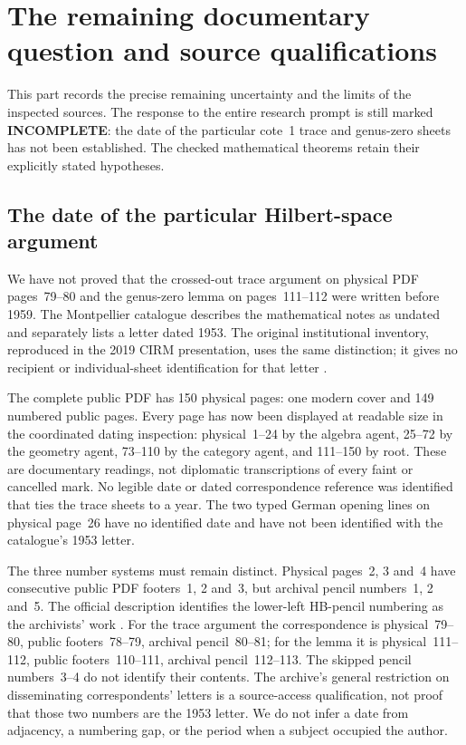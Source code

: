 \section{The remaining documentary question and source qualifications}

This part records the precise remaining uncertainty and the limits of
the inspected sources. The response to the entire research prompt is
still marked \textbf{INCOMPLETE}: the date of the particular cote~1
trace and genus-zero sheets has not been established. The checked
mathematical theorems retain their explicitly stated hypotheses.

\subsection{The date of the particular Hilbert-space argument}

We have not proved that the crossed-out trace argument on physical PDF
pages~79--80 and the genus-zero lemma on pages~111--112 were written
before 1959. The Montpellier catalogue describes the mathematical
notes as undated and separately lists a letter dated 1953. The
original institutional inventory, reproduced in the 2019 CIRM
presentation, uses the same distinction; it gives no recipient or
individual-sheet identification for that letter
\cite{geoMontpellierCatalogue,algMontpellierInventoryPresentation2019}.

The complete public PDF has 150 physical pages: one modern cover and
149 numbered public pages. Every page has now been displayed at
readable size in the coordinated dating inspection: physical~1--24
by the algebra agent, 25--72 by the geometry agent, 73--110 by the
category agent, and 111--150 by root. These are documentary readings,
not diplomatic transcriptions of every faint or cancelled mark.
No legible date or dated correspondence reference was identified
that ties the trace sheets to a year. The two typed German opening
lines on physical page~26 have no identified date and have not been
identified with the catalogue's 1953 letter.

The three number systems must remain distinct. Physical pages~2, 3
and~4 have consecutive public PDF footers~1, 2 and~3, but archival
pencil numbers~1, 2 and~5. The official description identifies the
lower-left HB-pencil numbering as the archivists' work
\cite[``La num\'erisation de conservation'']{algMontpellierArchiveMethod}.
For the trace argument the correspondence is physical~79--80,
public footers~78--79, archival pencil~80--81; for the lemma it is
physical~111--112, public footers~110--111, archival pencil~112--113.
The skipped pencil numbers~3--4 do not identify their contents.
The archive's general restriction on disseminating correspondents'
letters is a source-access qualification, not proof that those two
numbers are the 1953 letter. We do not infer a date from adjacency,
a numbering gap, or the period when a subject occupied the author.

